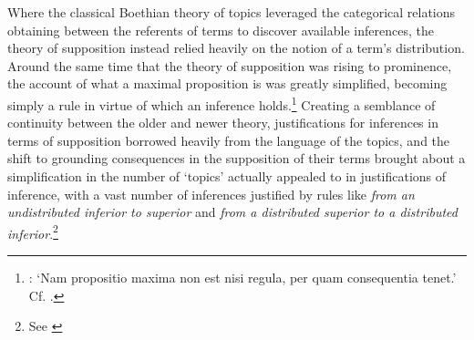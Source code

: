 \documentclass[a4paper, 11pt]{article}
\begin{document}
Where the classical Boethian theory of topics leveraged the categorical relations obtaining between the referents of terms to discover available inferences, the theory of supposition instead relied heavily on the notion of a term's distribution. Around the same time that the theory of supposition was rising to prominence,  the account of what a maximal proposition is was greatly simplified, becoming simply a rule in virtue of which an inference holds.\footnote{\autocite[76.5-7]{BurleyDPAL}: `Nam propositio maxima non est nisi regula, per quam consequentia tenet.' Cf. \autocite[31.3-6]{OckhamEL}.} Creating a semblance of continuity between the older and newer theory, justifications for inferences in terms of supposition borrowed heavily from the language of the topics, and the shift to grounding consequences in the supposition of their terms brought about a simplification in the number of `topics' actually appealed to in justifications of inference, with a vast number of inferences justified by rules like \emph{from an undistributed inferior to superior} and \emph{from a distributed superior to a distributed inferior}.\footnote{See \autocite[\textit{passim}]{Green-Pedersen1980a}} 
\end{document}
